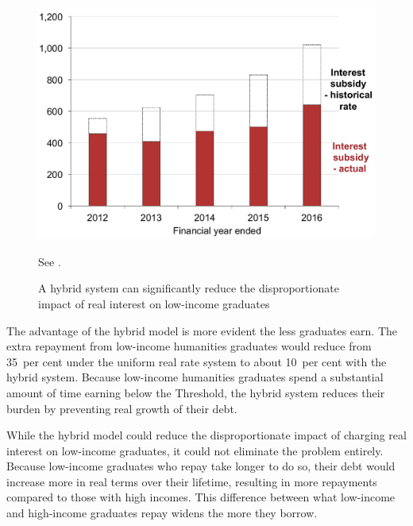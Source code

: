 \documentclass[embargoed]{grattan}
\begin{document}
\begin{figure}[!t]\vspace{1pt}
\caption{A hybrid system can significantly reduce the disproportionate impact of real interest on low-income graduates}\label{fig:fig17-a-hybrid-system-can-signif-reduce-disprop-impact-of-real-interest-low-income-grads}


\includegraphics[page=17]{atlas/Chartpack.pdf}

{See .}
\end{figure}

The advantage of the hybrid model is more evident the less graduates earn.
The extra repayment from low-income humanities graduates would reduce from 35~per cent under the uniform real rate system to about 10~per cent with the hybrid system.
Because low-income humanities graduates spend a substantial amount of time earning below the \gls{Threshold}, the hybrid system reduces their burden by preventing real growth of their debt.

While the hybrid model could reduce the disproportionate impact of charging real interest on low-income graduates, it could not eliminate the problem entirely.
Because low-income graduates who repay take longer to do so, their debt would increase more in real terms over their lifetime, resulting in more repayments compared to those with high incomes.
This difference between what low-income and high-income graduates repay widens the more they borrow.
\end{document}
